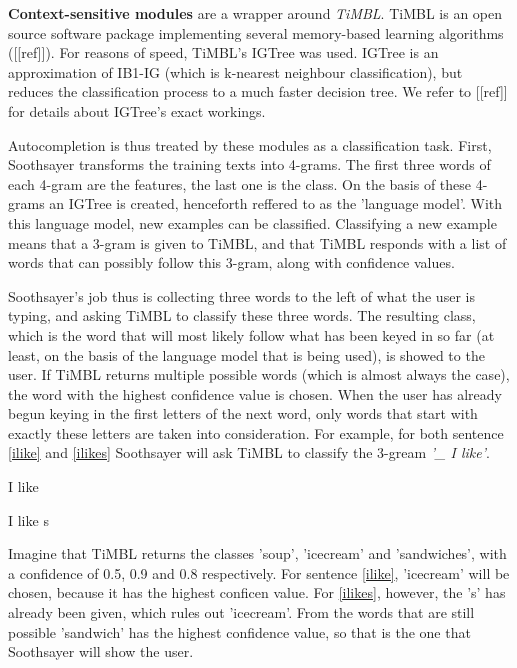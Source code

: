 \documentclass[11pt]{article}
\begin{document}
\textbf{Context-sensitive modules} are a wrapper around \emph{TiMBL}. TiMBL is an open source software package implementing several memory-based learning algorithms ([[ref]]). For reasons of speed, TiMBL's IGTree was used. IGTree is an approximation of IB1-IG (which is k-nearest neighbour classification), but reduces the classification process to a much faster decision tree. We refer to [[ref]] for details about IGTree's exact workings.

Autocompletion is thus treated by these modules as a classification task. First, Soothsayer transforms the training texts into 4-grams. The first three words of each 4-gram are the features, the last one is the class. On the basis of these 4-grams an IGTree is created, henceforth reffered to as the 'language model'. With this language model, new examples can be classified. Classifying a new example means that a 3-gram is given to TiMBL, and that TiMBL responds with a list of words that can possibly follow this 3-gram, along with confidence values. 

Soothsayer's job thus is collecting three words to the left of what the user is typing, and asking TiMBL to classify these three words. The resulting class, which is the word that will most likely follow what has been keyed in so far (at least, on the basis of the language model that is being used), is showed to the user. If TiMBL returns multiple possible words (which is almost always the case), the word with the highest confidence value is chosen. When the user has already begun keying in the first letters of the next word, only words that start with exactly these letters are taken into consideration. For example, for both sentence \ref{ilike} and \ref{ilikes} Soothsayer will ask TiMBL to classify the 3-gream \emph{'\_ I like'}.

\begin{examples}
\item I like \label{ilike}
\item I like s \label{ilikes}
\end{examples}

Imagine that TiMBL returns the classes 'soup', 'icecream' and 'sandwiches', with a confidence of 0.5, 0.9 and 0.8 respectively. For sentence \ref{ilike}, 'icecream' will be chosen, because it has the highest conficen value. For \ref{ilikes}, however, the 's' has already been given, which rules out 'icecream'. From the words that are still possible 'sandwich' has the highest confidence value, so that is the one that Soothsayer will show the user.
\end{document}
